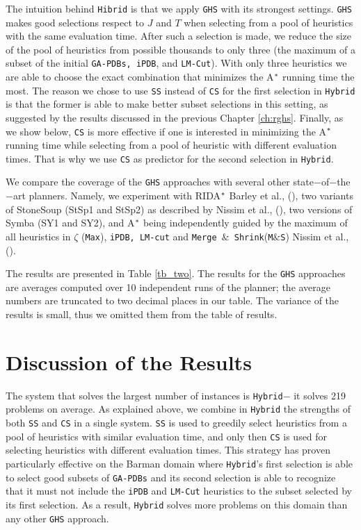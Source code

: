 The intuition behind \texttt{Hibrid} is that we apply \texttt{GHS} with its strongest settings. \texttt{GHS} makes good selections respect to $J$ and $T$ when selecting from a pool of heuristics with the same evaluation time. After such a selection is made, we reduce the size of the pool of heuristics from possible thousands to only three (the maximum of a subset of the initial \texttt{GA-PDBs, iPDB}, and \texttt{LM-Cut}). With only three heuristics we are able to choose the exact combination that minimizes the A$\sp{*}$ running time the most. The reason we chose to use \texttt{SS} instead of \texttt{CS} for the first selection in \texttt{Hybrid} is that the former is able to make better subset selections in this setting, as suggested by the results discussed in the previous Chapter \ref{ch:rghs}. Finally, as we show below, \texttt{CS} is more effective if one is interested in minimizing the A$\sp{*}$ running time while selecting from a pool of heuristic with different evaluation times. That is why we use \texttt{CS} as predictor for the second selection in \texttt{Hybrid}.

We compare the coverage of the \texttt{GHS} approaches with several other state$-$of$-$the$-$art planners. Namely, we experiment with RIDA$\sp{*}$ Barley et al., (\citeyear{BarleySantiagoOver}), two variants of StoneSoup (StSp1 and StSp2) as described by Nissim et al., (\citeyear{nissim2011computing}), two versions of Symba (SY1 and SY2), and A$\sp{*}$ being independently guided by the maximum of all heuristics in $\zeta$ (\texttt{Max}), \texttt{iPDB, LM-cut} and \texttt{Merge $\&$ Shrink}(\texttt{M$\&$S}) Nissim et al., (\citeyear{nissim2011computing}).

The results are presented in Table \ref{tb_two}. The results for the \texttt{GHS} approaches are averages computed over 10 independent runs of the planner; the average numbers are truncated to two decimal places in our table. The variance of the results is small, thus we omitted them from the table of results.

\section{Discussion of the Results}
\noindent
The system that solves the largest number of instances is \texttt{Hybrid}$-$ it solves 219 problems on average. As explained above, we combine in \texttt{Hybrid} the strengths of both \texttt{SS} and \texttt{CS} in a single system. \texttt{SS} is used to greedily select heuristics from a pool of heuristics with similar evaluation time, and only then \texttt{CS} is used for selecting heuristics with different evaluation times. This strategy has proven particularly effective on the Barman domain where \texttt{Hybrid}'s first selection is able to select good subsets of \texttt{GA-PDBs} and its second selection is able to recognize that it must not include the \texttt{iPDB} and \texttt{LM-Cut} heuristics to the subset selected by its first selection. As a result, \texttt{Hybrid} solves more problems on this domain than any other \texttt{GHS} approach.

